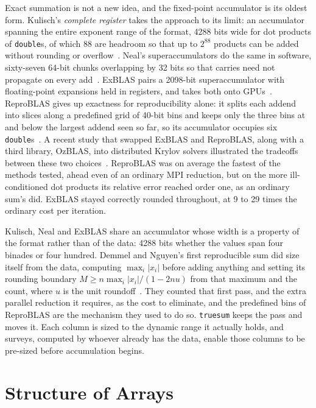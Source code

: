 \documentclass[acmsmall,screen,review]{acmart}
\newcommand{\code}[1]{\texttt{#1}}
\newcommand{\truesum}{\code{truesum}}
\begin{document}
Exact summation is not a new idea, and the fixed-point accumulator is its oldest form. Kulisch's \emph{complete register} takes the approach to its limit: an accumulator spanning the entire exponent range of the format, 4288 bits wide for dot products of \code{double}s, of which 88 are headroom so that up to $2^{88}$ products can be added without rounding or overflow~\cite{kulisch2008,kulisch2011,kulisch1788}. Neal's superaccumulators do the same in software, sixty-seven 64-bit chunks overlapping by 32 bits so that carries need not propagate on every add~\cite{neal2015}. ExBLAS pairs a 2098-bit superaccumulator with floating-point expansions held in registers, and takes both onto GPUs~\cite{iakymchuk2015,collange2015}. ReproBLAS gives up exactness for reproducibility alone: it splits each addend into slices along a predefined grid of 40-bit bins and keeps only the three bins at and below the largest addend seen so far, so its accumulator occupies six \code{double}s~\cite{ahrens2016,ahrens2020}. A recent study that swapped ExBLAS and ReproBLAS, along with a third library, OzBLAS, into distributed Krylov solvers illustrated the tradeoffs between these two choices~\cite{lei2025}. ReproBLAS was on average the fastest of the methods tested, ahead even of an ordinary MPI reduction, but on the more ill-conditioned dot products its relative error reached order one, as an ordinary sum's did. ExBLAS stayed correctly rounded throughout, at 9 to 29 times the ordinary cost per iteration.

Kulisch, Neal and ExBLAS share an accumulator whose width is a property of the format rather than of the data: 4288 bits whether the values span four binades or four hundred. Demmel and Nguyen's first reproducible sum did size itself from the data, computing $\max_i |x_i|$ before adding anything and setting its rounding boundary $M \ge n \max_i|x_i| / (1 - 2nu)$ from that maximum and the count, where $u$ is the unit roundoff~\cite{demmel2013,demmel2015}. They counted that first pass, and the extra parallel reduction it requires, as the cost to eliminate, and the predefined bins of ReproBLAS are the mechanism they used to do so. \truesum{} keeps the pass and moves it. Each column is sized to the dynamic range it actually holds, and surveys, computed by whoever already has the data, enable those columns to be pre-sized before accumulation begins.

\section{Structure of Arrays}
\end{document}
